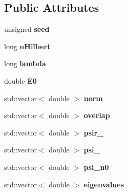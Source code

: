 \subsection*{Public Attributes}
\begin{DoxyCompactItemize}
\item 
unsigned {\bfseries seed}\hypertarget{classlhamil_a403c4979c8c75a247d526a88ad237d73}{}\label{classlhamil_a403c4979c8c75a247d526a88ad237d73}

\item 
long {\bfseries n\+Hilbert}\hypertarget{classlhamil_a4196bb19140860780faa0227b2b2d9d5}{}\label{classlhamil_a4196bb19140860780faa0227b2b2d9d5}

\item 
long {\bfseries lambda}\hypertarget{classlhamil_a19fc0f14305488a0f250b0e6e6541a32}{}\label{classlhamil_a19fc0f14305488a0f250b0e6e6541a32}

\item 
double {\bfseries E0}\hypertarget{classlhamil_a83f32edb3593b382e2cb3e469d95025e}{}\label{classlhamil_a83f32edb3593b382e2cb3e469d95025e}

\item 
std\+::vector$<$ double $>$ {\bfseries norm}\hypertarget{classlhamil_ae1e5cf1878aea2198372f64cd038ccc8}{}\label{classlhamil_ae1e5cf1878aea2198372f64cd038ccc8}

\item 
std\+::vector$<$ double $>$ {\bfseries overlap}\hypertarget{classlhamil_ab312761bed0e3f65e7143e06339e0773}{}\label{classlhamil_ab312761bed0e3f65e7143e06339e0773}

\item 
std\+::vector$<$ double $>$ {\bfseries psir\+\_}\hypertarget{classlhamil_a30af2fba8c46ff87ec1144986321de93}{}\label{classlhamil_a30af2fba8c46ff87ec1144986321de93}

\item 
std\+::vector$<$ double $>$ {\bfseries psi\+\_}\hypertarget{classlhamil_ad46e5575cd78453a79a4960d8f050708}{}\label{classlhamil_ad46e5575cd78453a79a4960d8f050708}

\item 
std\+::vector$<$ double $>$ {\bfseries psi\+\_\+n0}\hypertarget{classlhamil_a8380f1d9b7b9e819b43da1f374cc86b4}{}\label{classlhamil_a8380f1d9b7b9e819b43da1f374cc86b4}

\item 
std\+::vector$<$ double $>$ {\bfseries eigenvalues}\hypertarget{classlhamil_ae80fe2a6e59632516505e834f64053f2}{}\label{classlhamil_ae80fe2a6e59632516505e834f64053f2}


\end{DoxyCompactItemize}
